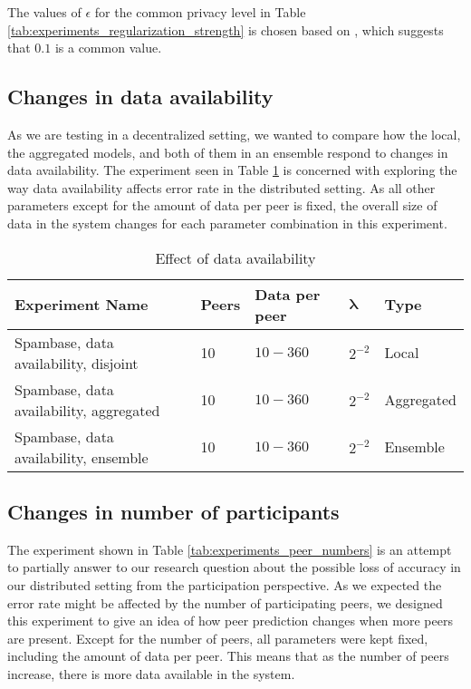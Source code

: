 The values of $\epsilon$ for the  common privacy level in Table \ref{tab:experiments_regularization_strength} is chosen based on \cite{dwork2008differential}, which suggests that $0.1$ is a common value.

\subsection{Changes in data availability}

As we are testing in a decentralized setting, we wanted to compare how the local, the aggregated models, and both of them in an ensemble respond to changes in data availability.  The experiment seen in Table \ref{tab:experiments_data_availability} is concerned with exploring the way data availability affects error rate in the distributed setting. As all other parameters except for the amount of data per peer is fixed, the overall size of data in the system changes for each parameter combination in this experiment.

\begin{table}[h]
	\centering
	\begin{tabular}{|l|l|l|l|l|}
		\textbf{Experiment Name}                                 & \textbf{Peers} & \textbf{Data per peer} & $\boldsymbol{\lambda}$  & \textbf{Type}       \\
		\hline
		Spambase, data availability, disjoint         & 10    & $10-360$  & $2^{-2}$       & Local      \\
		Spambase, data availability, aggregated    & 10    & $10-360$  & $2^{-2}$       & Aggregated \\
		Spambase, data availability, ensemble & 10    & $10-360$  & $2^{-2}$   & Ensemble  
	\end{tabular}
	\caption{Effect of data availability}
	\label{tab:experiments_data_availability}
\end{table}

\subsection{Changes in number of participants}

 
The experiment shown in Table \ref{tab:experiments_peer_numbers} is an attempt to partially answer to our research question about the possible loss of accuracy in our distributed setting from the participation perspective. As we expected the error rate might be affected by the number of participating peers, we designed this experiment to give an idea of how peer prediction changes when more peers are present. Except for the number of peers, all parameters were kept fixed, including the amount of data per peer. This means that as the number of peers increase, there is more data available in the system.

